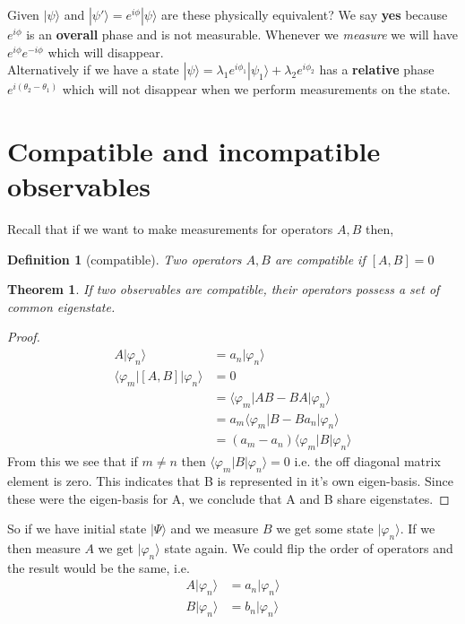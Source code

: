 \documentclass[a4paper, 11pt]{article}
\newtheorem*{theorem}{Theorem}
\newtheorem*{definition}{Definition}
\newcommand{\ket}[1]{|#1\rangle}
\newcommand{\bra}[1]{\langle #1 |}
\begin{document}
Given $|\psi\rangle$ and $|\psi'\rangle = e^{i\phi}|\psi\rangle$ are these physically equivalent? We say \textbf{yes} because $e^{i\phi}$ is an \textbf{overall} phase and is not measurable. Whenever we \textit{measure} we will have $e^{i\phi}e^{-i\phi}$ which will disappear.  \\ 

Alternatively if we have a state $|\psi\rangle = \lambda_1 e^{i\phi_1}|\psi_1\rangle + \lambda_2 e^{i\phi_2}$ has a \textbf{relative} phase $e^{i(\theta_2-\theta_1)}$ which will not disappear when we perform measurements on the state. \\


\section*{Compatible and incompatible observables} 

	\noindent Recall that if we want to make measurements for operators $A,B$ then, 
	\begin{definition}[compatible]
		Two operators $A, B$ are compatible if $[A,B]=0$
	\end{definition}
	\begin{theorem}
		If two observables are compatible, their operators possess a set of common eigenstate. 
	\end{theorem}
	\begin{proof}
		\begin{align*}
		A\ket{\varphi_n} &= a_n\ket{\varphi_n} \\ 
		\bra{\varphi_m}[A,B]\ket{\varphi_n} &= 0 \\ 
			&= \bra{\varphi_m}AB - BA\ket{\varphi_n} \\ 
			&= a_m\bra{\varphi_m}B-Ba_n\ket{\varphi_n} \\ 
			&= (a_m-a_n)\bra{\varphi_m}B\ket{\varphi_n} 
		\end{align*}
		From this we see that if $m\neq n$ then $\bra{\varphi_m}B\ket{\varphi_n} = 0$ i.e. the off diagonal matrix element is zero. This indicates that B is represented in it's own eigen-basis. Since these were the eigen-basis for A, we conclude that A and B share eigenstates. 
	\end{proof}
	
	So if we have initial state $\ket{\Psi}$ and we measure $B$ we get some state $\ket{\varphi_n}$. If we then measure $A$ we get $\ket{\varphi_n}$ state again. We could flip the order of operators and the result would be the same, i.e. 
		\begin{align}
			A\ket{\varphi_n} &= a_n\ket{\varphi_n}\\
			B\ket{\varphi_n} &= b_n\ket{\varphi_n}
		\end{align}
\end{document}
